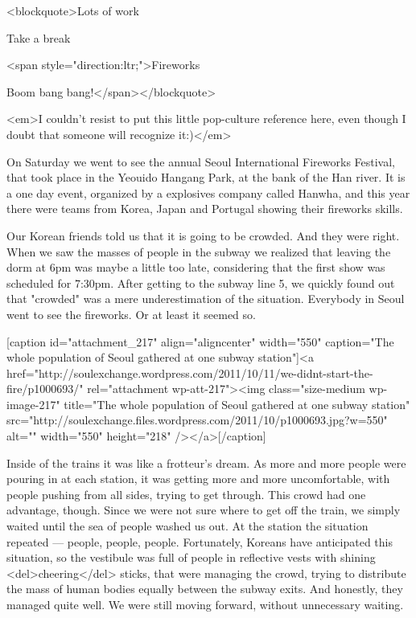\begin{post}
	\begin{content}
<blockquote>Lots of work

Take a break

<span style="direction:ltr;">Fireworks

Boom bang bang!</span></blockquote>

<em>I couldn't resist to put this little pop-culture reference here, even though I doubt that someone will recognize it:)</em>



On Saturday we went to see the annual Seoul International Fireworks Festival, that took place in the Yeouido Hangang Park, at the bank of the Han river. It is a one day event, organized by a explosives company called Hanwha, and this year there were teams from Korea, Japan and Portugal showing their fireworks skills.



Our Korean friends told us that it is going to be crowded. And they were right. When we saw the masses of people in the subway we realized that leaving the dorm at 6pm was maybe a little too late, considering that the first show was scheduled for 7:30pm. After getting to the subway line 5, we quickly found out that "crowded" was a mere underestimation of the situation. Everybody in Seoul went to see the fireworks. Or at least it seemed so.



[caption id="attachment_217" align="aligncenter" width="550" caption="The whole population of Seoul gathered at one subway station"]<a href="http://soulexchange.wordpress.com/2011/10/11/we-didnt-start-the-fire/p1000693/" rel="attachment wp-att-217"><img class="size-medium wp-image-217" title="The whole population of Seoul gathered at one subway station" src="http://soulexchange.files.wordpress.com/2011/10/p1000693.jpg?w=550" alt="" width="550" height="218" /></a>[/caption]



Inside of the trains it was like a frotteur's dream. As more and more people were pouring in at each station, it was getting more and more uncomfortable, with people pushing from all sides, trying to get through. This crowd had one advantage, though. Since we were not sure where to get off the train, we simply waited until the sea of people washed us out. At the station the situation repeated — people, people, people. Fortunately, Koreans have anticipated this situation, so the vestibule was full of people in reflective vests with shining <del>cheering</del> sticks, that were managing the crowd, trying to distribute the mass of human bodies equally between the subway exits. And honestly, they managed quite well. We were still moving forward, without unnecessary waiting.




\end{content}
\end{post}
